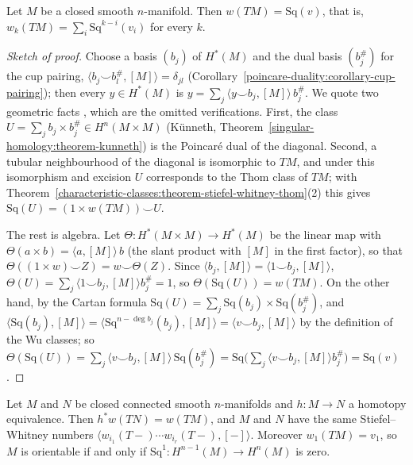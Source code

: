 \begin{theorem}[Wu's formula]\label{characteristic-classes:theorem-wu}
Let $M$ be a closed smooth $n$-manifold. Then $w(TM) = \mathrm{Sq}(v)$, that is, $w_k(TM) = \sum_i\mathrm{Sq}^{k-i}(v_i)$ for every $k$.
\end{theorem}

\begin{proof}[Sketch of proof]
Choose a basis $(b_j)$ of $H^*(M)$ and the dual basis $(b_j^\#)$ for the cup pairing, $\langle b_j \smile b_l^\#, [M]\rangle = \delta_{jl}$
(Corollary~\ref{poincare-duality:corollary-cup-pairing}); then every $y \in H^*(M)$ is $y = \sum_j\langle y \smile b_j, [M]\rangle\,b_j^\#$. We quote two
geometric facts \cite[Chapter 11]{milnor-stasheff}, which are the omitted verifications. First, the class $U = \sum_jb_j \times b_j^\# \in H^n(M \times M)$
(K\"unneth, Theorem~\ref{singular-homology:theorem-kunneth}) is the Poincar\'e dual of the diagonal. Second, a tubular neighbourhood of the diagonal is
isomorphic to $TM$, and under this isomorphism and excision $U$ corresponds to the Thom class of $TM$; with
Theorem~\ref{characteristic-classes:theorem-stiefel-whitney-thom}(2) this gives $\mathrm{Sq}(U) = (1 \times w(TM)) \smile U$.

The rest is algebra. Let $\Theta \colon H^*(M \times M) \to H^*(M)$ be the linear map with $\Theta(a \times b) = \langle a, [M]\rangle\,b$ (the slant
product with $[M]$ in the first factor), so that $\Theta((1 \times w) \smile Z) = w \smile \Theta(Z)$. Since $\langle b_j, [M]\rangle = \langle 1 \smile b_j, [M]\rangle$,
$\Theta(U) = \sum_j\langle 1 \smile b_j, [M]\rangle b_j^\# = 1$, so $\Theta(\mathrm{Sq}(U)) = w(TM)$. On the other hand, by the Cartan formula
$\mathrm{Sq}(U) = \sum_j\mathrm{Sq}(b_j) \times \mathrm{Sq}(b_j^\#)$, and $\langle\mathrm{Sq}(b_j), [M]\rangle = \langle\mathrm{Sq}^{n - \deg b_j}(b_j), [M]\rangle
= \langle v \smile b_j, [M]\rangle$ by the definition of the Wu classes; so
$\Theta(\mathrm{Sq}(U)) = \sum_j\langle v \smile b_j, [M]\rangle\,\mathrm{Sq}(b_j^\#) = \mathrm{Sq}\bigl(\sum_j\langle v \smile b_j, [M]\rangle b_j^\#\bigr) = \mathrm{Sq}(v)$.
\end{proof}

\begin{corollary}\label{characteristic-classes:corollary-wu-invariance}
Let $M$ and $N$ be closed connected smooth $n$-manifolds and $h \colon M \to N$ a homotopy equivalence. Then $h^*w(TN) = w(TM)$, and $M$ and $N$
have the same Stiefel--Whitney numbers $\langle w_{i_1}(T-) \cdots w_{i_r}(T-), [-]\rangle$. Moreover $w_1(TM) = v_1$, so $M$ is orientable if and only if
$\mathrm{Sq}^1 \colon H^{n-1}(M) \to H^n(M)$ is zero.
\end{corollary}

